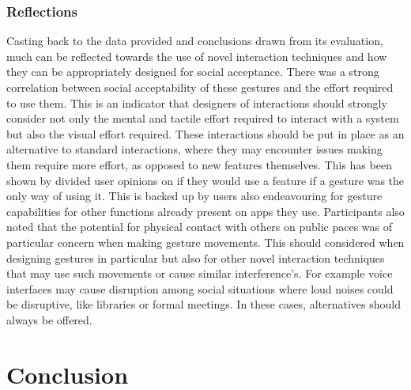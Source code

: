 \documentclass{l4proj}
\begin{document}
\subsection{Reflections}
Casting back to the data provided and conclusions drawn from its evaluation, much can be reflected towards the use of novel interaction techniques and how they can be appropriately designed for social acceptance. There was a strong correlation between social acceptability of these gestures and the effort required to use them. This is an indicator that designers of interactions should strongly consider not only the mental and tactile effort required to interact with a system but also the visual effort required. These interactions should be put in place as an alternative to standard interactions, where they may encounter issues making them require more effort, as opposed to new features themselves. This has been shown by divided user opinions on if they would use a feature if a gesture was the only way of using it. This is backed up by users also endeavouring for gesture capabilities for other functions already present on apps they use. Participants also noted that the potential for physical contact with others on public paces was of particular concern when making gesture movements. This should considered when designing gestures in particular but also for other novel interaction techniques that may use such movements or cause similar interference's. For example voice interfaces may cause disruption among social situations where loud noises could be disruptive, like libraries or formal meetings. In these cases, alternatives should always be offered.


\chapter{Conclusion}  
\end{document}
